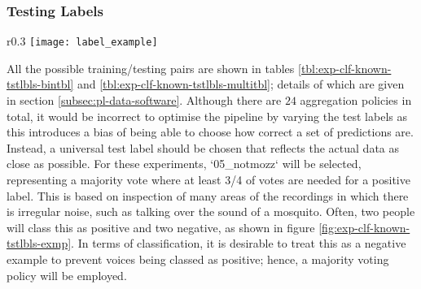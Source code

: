         \subsubsection{Testing Labels}
        \label{subsubsec:exp-clf-known-tstlbls}
            \begin{wrapfigure}{r}{0.3\textwidth}
                \centering
                \texttt{[image: label\_example]}
                \caption{An example of noise where there is $50/50$ disagreement between labellers.}
                \label{fig:exp-clf-known-tstlbls-exmp}
            \end{wrapfigure}
            All the possible training/testing pairs are shown in tables \ref{tbl:exp-clf-known-tstlbls-bintbl} and \ref{tbl:exp-clf-known-tstlbls-multitbl}; details of which are given in section \ref{subsec:pl-data-software}. Although there are $24$ aggregation policies in total, it would be incorrect to optimise the pipeline by varying the test labels as this introduces a bias of being able to choose how correct a set of predictions are. Instead, a universal test label should be chosen that reflects the actual data as close as possible. For these experiments, `05\_notmozz` will be selected, representing a majority vote where at least 3/4 of votes are needed for a positive label. This is based on inspection of many areas of the recordings in which there is irregular noise, such as talking over the sound of a mosquito. Often, two people will class this as positive and two negative, as shown in figure \ref{fig:exp-clf-known-tstlbls-exmp}. In terms of classification, it is desirable to treat this as a negative example to prevent voices being classed as positive; hence, a majority voting policy will be employed.

